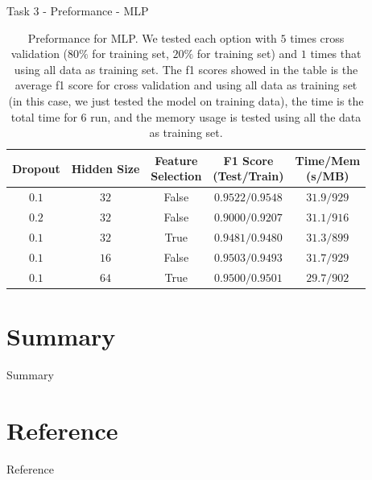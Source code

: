 \documentclass{beamer}
\begin{document}
\begin{frame}{Task 3 - Preformance - MLP}

  \begin{table}[H]
    \centering
    \begin{tabular}{|c|c|c|c|c|}
      \hline
      Dropout & Hidden Size & \makecell{Feature                                \\ Selection} & \makecell{F1 Score \\ (Test/Train)} & \makecell{Time/Mem \\ (s/MB)} \\
      \hline
      $0.1$   & $32$        & False             & $0.9522/0.9548$ & $31.9/929$ \\
      \hline
      $0.2$   & $32$        & False             & $0.9000/0.9207$ & $31.1/916$ \\
      \hline
      $0.1$   & $32$        & True              & $0.9481/0.9480$ & $31.3/899$ \\
      \hline
      $0.1$   & $16$        & False             & $0.9503/0.9493$ & $31.7/929$ \\
      \hline
      $0.1$   & $64$        & True              & $0.9500/0.9501$ & $29.7/902$ \\
      \hline
    \end{tabular}
    \caption{Preformance for MLP. We tested each option with $5$ times cross validation ($80\%$ for training set, $20\%$ for training set) and $1$ times that using all data as training set. The f1 scores showed in the table is the average f1 score for cross validation and using all data as training set (in this case, we just tested the model on training data), the time is the total time for $6$ run, and the memory usage is tested using all the data as training set.}
  \end{table}

\end{frame}

\section{Summary}

\begin{frame}{Summary}

\end{frame}

\section*{Reference}
\begin{frame}[allowframebreaks]{Reference}
  \printbibliography
\end{frame}

\appendix
\end{document}
